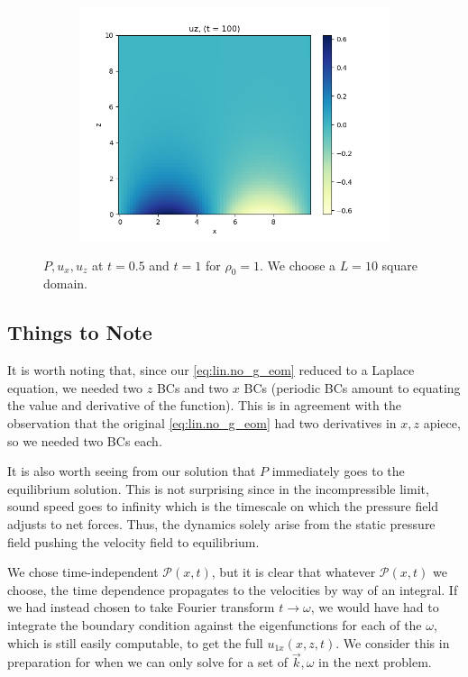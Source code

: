 \documentclass[11pt,
        usenames, %
        dvipsnames %
    ]{report}
\begin{document}
\begin{figure}[!h]
\begin{subfigure}{0.3\textwidth}
        \includegraphics[width=\textwidth]{plots/no_g_uz_t100.png}
    \end{subfigure}
    \caption{$P, u_x, u_z$ at $t = 0.5$ and $t = 1$ for $\rho_0 = 1$. We choose
    a $L = 10$ square domain.}\label{fig:no_g}
\end{figure}

\subsection{Things to Note}

It is worth noting that, since our \autoref{eq:lin.no_g_eom} reduced to a Laplace
equation, we needed two $z$ BCs and two $x$ BCs (periodic BCs amount to equating
the value and derivative of the function). This is in agreement with the
observation that the original \autoref{eq:lin.no_g_eom} had two derivatives in
$x, z$ apiece, so we needed two BCs each.

It is also worth seeing from our solution that $P$ immediately goes to the
equilibrium solution. This is not surprising since in the incompressible limit,
sound speed goes to infinity which is the timescale on which the pressure field
adjusts to net forces. Thus, the dynamics solely arise from the static pressure
field pushing the velocity field to equilibrium.

We chose time-independent $\mathcal{P}(x, t)$, but it is clear that whatever
$\mathcal{P}(x, t)$ we choose, the time dependence propagates to the velocities
by way of an integral. If we had instead chosen to take Fourier transform $t \to
\omega$, we would have had to integrate the boundary condition against the
eigenfunctions for each of the $\omega$, which is still easily computable, to
get the full $u_{1x}(x, z, t)$. We consider this in preparation for when we can
only solve for a set of $\vec{k}, \omega$ in the next problem.
\end{document}
